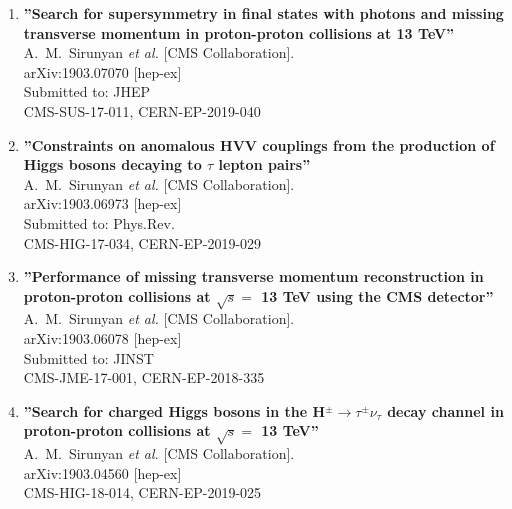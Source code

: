 \begin{enumerate}
\item%
{\bf ''Search for supersymmetry in final states with photons and missing transverse momentum in proton-proton collisions at 13 TeV''}
  \\{}A.~M.~Sirunyan {\it et al.} [CMS Collaboration].
  \\{}arXiv:1903.07070 [hep-ex]
  \\{}Submitted to: JHEP
  \\{}CMS-SUS-17-011, CERN-EP-2019-040

\item%
{\bf ''Constraints on anomalous HVV couplings from the production of Higgs bosons decaying to $\tau$ lepton pairs''}
  \\{}A.~M.~Sirunyan {\it et al.} [CMS Collaboration].
  \\{}arXiv:1903.06973 [hep-ex]
  \\{}Submitted to: Phys.Rev.
  \\{}CMS-HIG-17-034, CERN-EP-2019-029

\item%
{\bf ''Performance of missing transverse momentum reconstruction in proton-proton collisions at $\sqrt{s} =$ 13 TeV using the CMS detector''}
  \\{}A.~M.~Sirunyan {\it et al.} [CMS Collaboration].
  \\{}arXiv:1903.06078 [hep-ex]
  \\{}Submitted to: JINST
  \\{}CMS-JME-17-001, CERN-EP-2018-335

\item%
{\bf ''Search for charged Higgs bosons in the H$^{\pm} \to \tau^{\pm}\nu_\tau$ decay channel in proton-proton collisions at $\sqrt{s}=$ 13 TeV''}
  \\{}A.~M.~Sirunyan {\it et al.} [CMS Collaboration].
  \\{}arXiv:1903.04560 [hep-ex]
  \\{}CMS-HIG-18-014, CERN-EP-2019-025


\end{enumerate}
